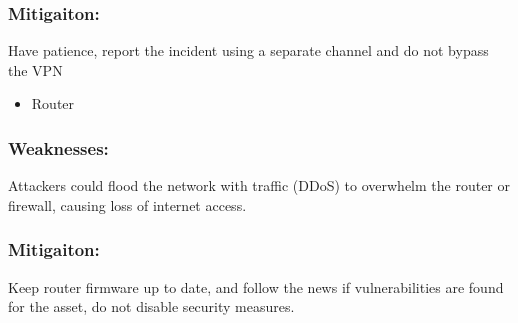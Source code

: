 \documentclass[
	letterpaper, %
	10pt, %
	unnumberedsections, %
	twoside, %
]{APAAssignment}
\begin{document}
\begin{singlespace}
	\subsubsection{Mitigaiton:} Have patience, report the incident using a separate channel and do not bypass the VPN

	\begin{itemize}
		\item Router
	\end{itemize}
	
	\subsubsection{Weaknesses:} Attackers could flood the network with traffic (DDoS) to overwhelm the router or firewall, causing loss of internet access.
	\subsubsection{Mitigaiton:} Keep router firmware up to date, and follow the news if vulnerabilities are found for the asset, do not disable security measures.
	
	
\end{singlespace}
\end{document}
